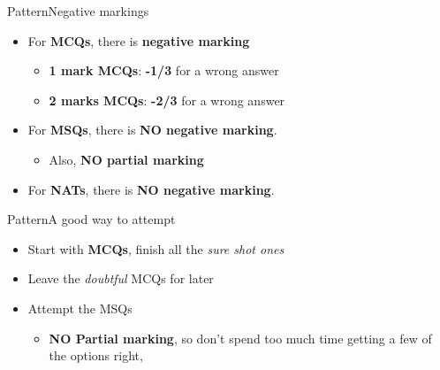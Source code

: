 \documentclass[handout]{beamer}
\begin{document}
\begin{frame}{Pattern}{Negative markings}
    \begin{itemize}
        \item For \textbf{MCQs}, there is \textbf{negative marking}
              \begin{itemize}
                  \item \textbf{1 mark MCQs}: \textbf{-1/3} for a wrong answer
                  \item \textbf{2 marks MCQs}: \textbf{-2/3} for a wrong answer
              \end{itemize}
        \item For \textbf{MSQs}, there is \textbf{NO negative marking}.
              \begin{itemize}
                  \item Also, \textbf{NO partial marking}
              \end{itemize}
        \item For \textbf{NATs}, there is \textbf{NO negative marking}.
    \end{itemize}
\end{frame}

\begin{frame}{Pattern}{A good way to attempt}
    \begin{itemize}
        \item Start with \textbf{MCQs}, finish all the \emph{sure shot ones}
        \item Leave the \emph{doubtful} MCQs for later
        \item Attempt the MSQs
              \begin{itemize}
                  \item \textbf{NO Partial marking}, so don't spend too much time getting a few of the options right,
              \end{itemize}
    \end{itemize}
\end{frame}
\end{document}
